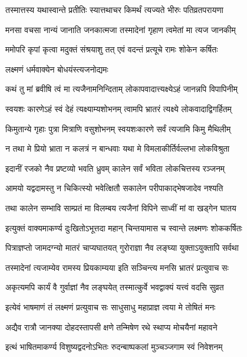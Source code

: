 \twolineshloka
{तस्मात्तस्य यथास्वान्ते प्रतीतिः स्यात्तथाचर}
{किमर्थं त्यज्यते भीरुः पतिव्रतपरायणा}%

\twolineshloka
{मनसा वचसा नान्यं जानाति जनकात्मजा}
{तस्मादेनां गृहाण त्वमेतां मा त्यज जानकीम्}%

\twolineshloka
{ममोपरि कृपां कृत्वा मदुक्तं संश्रयाशु तत्}
{एवं वदन्तं प्रत्यूचे रामः शोकेन कर्षितः}%

\onelineshloka
{लक्ष्मणं धर्मवाक्येन बोधयंस्त्यजनोद्यमः}%


\twolineshloka
{कथं तु मां ब्रवीषि त्वं मा त्यजैनामनिन्दिताम्}
{लोकापवादात्त्यक्ष्येऽहं जानन्नपि विपापिनीम्}%

\twolineshloka
{स्वयशः कारणेऽहं स्वं देहं त्यक्ष्याम्यशोभनम्}
{त्वामपि भ्रातरं त्यक्ष्ये लोकवादाद्विगर्हितम्}%

\twolineshloka
{किमुतान्ये गृहाः पुत्रा मित्राणि वसुशोभनम्}
{स्वयशःकारणे सर्वं त्यजामि किमु मैथिलीम्}%

\twolineshloka
{न तथा मे प्रियो भ्राता न कलत्रं न बान्धवाः}
{यथा मे विमलाकीर्तिर्वल्लभा लोकविश्रुता}%

\twolineshloka
{इदानीं रजको नैव प्रष्टव्यो भवति ध्रुवम्}
{कालेन सर्वं भविता लोकचित्तस्य रञ्जनम्}%

\twolineshloka
{आमयो यद्वदामस्तु न चिकित्स्यो भवेत्क्षितौ}
{सकालेन परीपाकाद्भेषजादेव नश्यति}%

\twolineshloka
{तथा कालेन सम्भावि साम्प्रतं मा विलम्बय}
{त्यजैनां विपिने साध्वीं मां वा खड्गेन घातय}%

\twolineshloka
{इत्युक्तं वाक्यमाकर्ण्य दुःखितोऽभूत्तदा महान्}
{चिन्तयामास च स्वान्ते लक्ष्मणः शोककर्षितः}%

\twolineshloka
{पित्राज्ञप्तो जामदग्न्यो मातरं चाप्यघातयत्}
{गुरोराज्ञा नैव लङ्घ्या युक्ताऽयुक्तापि सर्वथा}%

\twolineshloka
{तस्मादेनां त्यजाम्येव रामस्य प्रियकाम्यया}
{इति सञ्चिन्त्य मनसि भ्रातरं प्रत्युवाच सः}%


\twolineshloka
{अकृत्यमपि कार्यं वै गुर्वाज्ञां नैव लङ्घयेत्}
{तस्मात्कुर्वे भवद्वाक्यं यत्त्वं वदसि सुव्रत}%

\twolineshloka
{इत्येवं भाषमाणं तं लक्ष्मणं प्रत्युवाच सः}
{साधुसाधु महाप्राज्ञ त्वया मे तोषितं मनः}%

\twolineshloka
{अद्यैव रात्रौ जानक्या दोहदस्तापसी क्षणे}
{तन्मिषेण रथे स्थाप्य मोचयैनां महावने}%

\twolineshloka
{इत्थं भाषितमाकर्ण्य विशुष्यद्वदनोऽभितः}
{रुदन्बाष्पकलां मुञ्चञ्जगाम स्वं निवेशनम्}%

